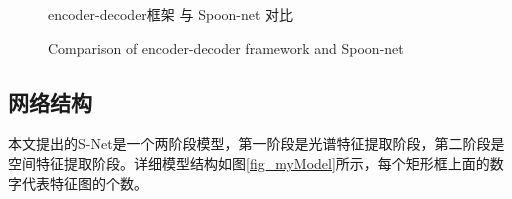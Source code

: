 \documentclass[10pt]{ctexart}
\begin{document}
\begin{multicols}{2}
\begin{figure}[H]
    \centering
    \caption{encoder-decoder框架 与 Spoon-net 对比}
    \addtocounter{figure}{-1}
    \vspace{-5pt}
    \renewcommand{\figurename}{Fig}
    \caption{Comparison of encoder-decoder framework and Spoon-net}
    \renewcommand{\figurename}{图}

    \label{fig:spoon_simple}
\end{figure}

\subsection{网络结构}
本文提出的S-Net是一个两阶段模型，第一阶段是光谱特征提取阶段，第二阶段是空间特征提取阶段。详细模型结构如图\ref{fig_myModel}所示，每个矩形框上面的数字代表特征图的个数。
\end{multicols}
\end{document}
